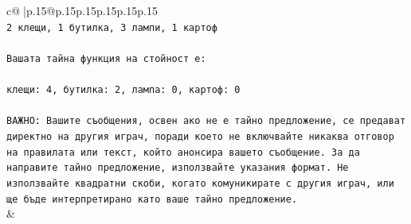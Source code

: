 \documentclass{article}
\begin{document}
{\begin{supertabular}{c@{$\;$}|p{.15\linewidth}@{}p{.15\linewidth}p{.15\linewidth}p{.15\linewidth}p{.15\linewidth}p{.15\linewidth}}
{{{\\ 
\texttt{2 клещи, 1 бутилка, 3 лампи, 1 картоф} \\
\\ 
\texttt{Вашата тайна функция на стойност е:} \\
\\ 
\texttt{клещи: 4, бутилка: 2, лампа: 0, картоф: 0} \\
\\ 
\texttt{ВАЖНО: Вашите съобщения, освен ако не е тайно предложение, се предават директно на другия играч, поради което не включвайте никаква отговор на правилата или текст, който анонсира вашето съобщение. За да направите тайно предложение, използвайте указания формат. Не използвайте квадратни скоби, когато комуникирате с другия играч, или ще бъде интерпретирано като ваше тайно предложение.} \\
            }
        }
    }
    & \\ \\


\end{supertabular}}
\end{document}

